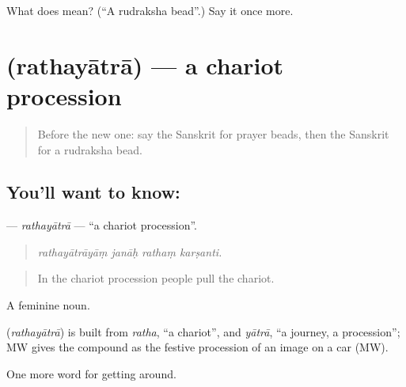 \begin{tcolorbox}[breakable,colback=teal!4,colframe=teal!35!black,title={Before you move on}]
What does  mean? (\textquotedblleft{}A rudraksha bead\textquotedblright{}.) Say it once more.
\end{tcolorbox}
\section[\texorpdfstring{\sk{रथयात्रा} (rathayātrā)}{रथयात्रा (rathayātrā)}]{ (rathayātrā) — a chariot procession}

\label{lesson:SA-C400-rathayatra}



\begin{quote}
Before the new one: say the Sanskrit for prayer beads, then the Sanskrit for a rudraksha bead.
\end{quote}

\subsection*{You'll want to know: }
\textbf{} — \emph{rathayātrā} — \textquotedblleft{}a chariot procession\textquotedblright{}.

\begin{quote}
   
\end{quote}

\begin{quote}
\emph{rathayātrāyāṃ janāḥ rathaṃ karṣanti.}
\end{quote}

\begin{quote}
In the chariot procession people pull the chariot.
\end{quote}

A feminine noun.

\begin{cousinweb}
\textbf{} (\emph{rathayātrā}) is built from \emph{ratha}, \textquotedblleft{}a chariot\textquotedblright{}, and \emph{yātrā}, \textquotedblleft{}a journey, a procession\textquotedblright{}; MW gives the compound as the festive procession of an image on a car (MW).
\end{cousinweb}

\begin{grammarlens}[title={What you've built}]
One more word for getting around.
\end{grammarlens}

